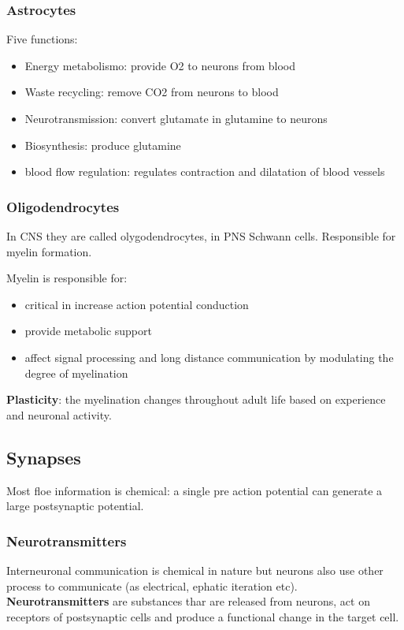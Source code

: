 \documentclass[12pt,article,oneside,a4paper]{memoir}
\begin{document}
\subsubsection{Astrocytes}

Five functions:
\begin{itemize}
\item Energy metabolismo: provide O2 to neurons from blood
\item Waste recycling: remove CO2 from neurons to blood
\item Neurotransmission: convert glutamate in glutamine to neurons
\item Biosynthesis: produce glutamine 
\item blood flow regulation: regulates contraction and dilatation of blood vessels
\end{itemize}
\subsubsection{Oligodendrocytes}
In CNS they are called olygodendrocytes, in PNS Schwann cells. Responsible for myelin formation.

Myelin is responsible for:
\begin{itemize}
\item critical in increase action potential conduction
\item provide metabolic support
\item affect signal processing and long distance communication by modulating the degree of myelination
\end{itemize}

\textbf{Plasticity}: the myelination changes throughout adult life based on experience and neuronal activity.
\subsection{Synapses}

Most floe information is chemical: a single pre action potential can generate a large postsynaptic potential. 

\subsubsection{Neurotransmitters}
Interneuronal communication is chemical in nature but neurons also use other process to communicate (as electrical, ephatic iteration etc). \textbf{Neurotransmitters} are substances thar are released from neurons, act on receptors of postsynaptic cells and produce a functional change in the target cell.
\end{document}
